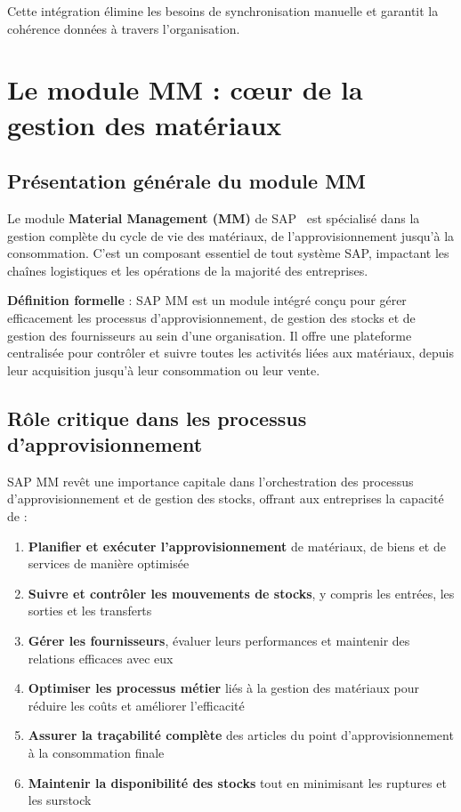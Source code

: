 \documentclass[12pt,a4paper,oneside]{report}
\begin{document}
Cette intégration élimine les besoins de synchronisation manuelle et garantit la cohérence données à travers l'organisation.

\section{Le module MM : cœur de la gestion des matériaux}\label{ch2:mm}

\subsection{Présentation générale du module MM}\label{ch2:mm-presentation}

Le module \textbf{Material Management (MM)} de SAP~\cite{sap-mm} est spécialisé dans la gestion complète du cycle de vie des matériaux,
de l'approvisionnement jusqu'à la consommation. C'est un composant essentiel de tout système SAP, impactant les chaînes
logistiques et les opérations de la majorité des entreprises.

\textbf{Définition formelle} : SAP MM est un module intégré conçu pour gérer efficacement les processus d'approvisionnement, 
de gestion des stocks et de gestion des fournisseurs au sein d'une organisation. Il offre une plateforme centralisée pour 
contrôler et suivre toutes les activités liées aux matériaux, depuis leur acquisition jusqu'à leur consommation ou leur vente.

\subsection{Rôle critique dans les processus d'approvisionnement}\label{ch2:mm-role}

SAP MM revêt une importance capitale dans l'orchestration des processus d'approvisionnement et de gestion des stocks, 
offrant aux entreprises la capacité de :

\begin{enumerate}[label=\arabic*., itemsep=0.2em]
	\item \textbf{Planifier et exécuter l'approvisionnement} de matériaux, de biens et de services de manière optimisée
	\item \textbf{Suivre et contrôler les mouvements de stocks}, y compris les entrées, les sorties et les transferts
	\item \textbf{Gérer les fournisseurs}, évaluer leurs performances et maintenir des relations efficaces avec eux
	\item \textbf{Optimiser les processus métier} liés à la gestion des matériaux pour réduire les coûts et améliorer l'efficacité
	\item \textbf{Assurer la traçabilité complète} des articles du point d'approvisionnement à la consommation finale
	\item \textbf{Maintenir la disponibilité des stocks} tout en minimisant les ruptures et les surstock
\end{enumerate}
\end{document}
